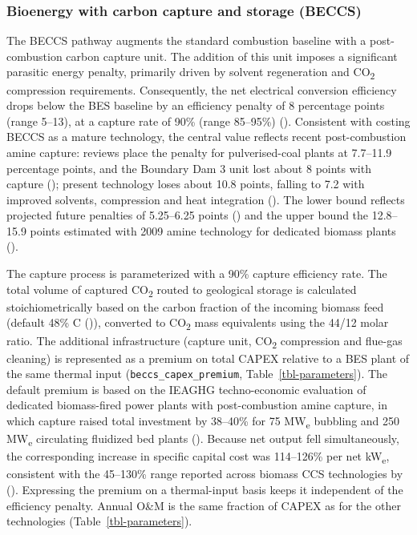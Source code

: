 \documentclass[
  letterpaper,
]{article}
\begin{document}
\subsubsection{Bioenergy with carbon capture and storage
(BECCS)}\label{bioenergy-with-carbon-capture-and-storage-beccs}

The BECCS pathway augments the standard combustion baseline with a
post-combustion carbon capture unit. The addition of this unit imposes a
significant parasitic energy penalty, primarily driven by solvent
regeneration and CO\textsubscript{2} compression requirements.
Consequently, the net electrical conversion efficiency drops below the
BES baseline by an efficiency penalty of 8 percentage points (range
5--13), at a capture rate of 90\% (range 85--95\%)
(). Consistent with costing BECCS as
a mature technology, the central value reflects recent post-combustion
amine capture: reviews place the penalty for pulverised-coal plants at
7.7--11.9 percentage points, and the Boundary Dam 3 unit lost about 8
points with capture (); present
technology loses about 10.8 points, falling to 7.2 with improved
solvents, compression and heat integration
(). The lower bound reflects
projected future penalties of 5.25--6.25 points
() and the upper bound the 12.8--15.9
points estimated with 2009 amine technology for dedicated biomass plants
().

The capture process is parameterized with a 90\% capture efficiency
rate. The total volume of captured CO\textsubscript{2} routed to
geological storage is calculated stoichiometrically based on the carbon
fraction of the incoming biomass feed (default 48\% C
()), converted to CO\textsubscript{2}
mass equivalents using the 44/12 molar ratio. The additional
infrastructure (capture unit, CO\textsubscript{2} compression and
flue-gas cleaning) is represented as a premium on total CAPEX relative
to a BES plant of the same thermal input
(\texttt{beccs\_capex\_premium}, Table~\ref{tbl-parameters}). The
default premium is based on the IEAGHG techno-economic evaluation of
dedicated biomass-fired power plants with post-combustion amine capture,
in which capture raised total investment by 38--40\% for 75
MW\textsubscript{e} bubbling and 250 MW\textsubscript{e} circulating
fluidized bed plants (). Because net
output fell simultaneously, the corresponding increase in specific
capital cost was 114--126\% per net kW\textsubscript{e}, consistent with
the 45--130\% range reported across biomass CCS technologies by
(). Expressing the premium on a
thermal-input basis keeps it independent of the efficiency penalty.
Annual O\&M is the same fraction of CAPEX as for the other technologies
(Table~\ref{tbl-parameters}).
\end{document}
